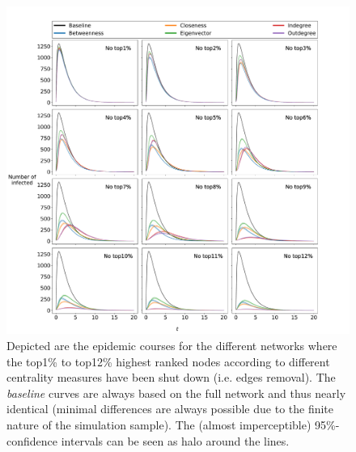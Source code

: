 \documentclass{Resources/netsci-project}
\begin{document}
\begin{figure}[!ht]
    \centering
    \includegraphics[width=\linewidth]{Figures/epidemic_course.pdf}
    \caption{Depicted are the epidemic courses for the different networks where the top1\% to top12\% highest ranked nodes according to different centrality measures have been shut down (i.e. edges removal). The \textit{baseline} curves are always based on the full network and thus nearly identical (minimal differences are always possible due to the finite nature of the simulation sample). The (almost imperceptible) 95\%-confidence intervals can be seen as halo around the lines.}
    \label{fig:epidemic_course}
\end{figure}
\end{document}
